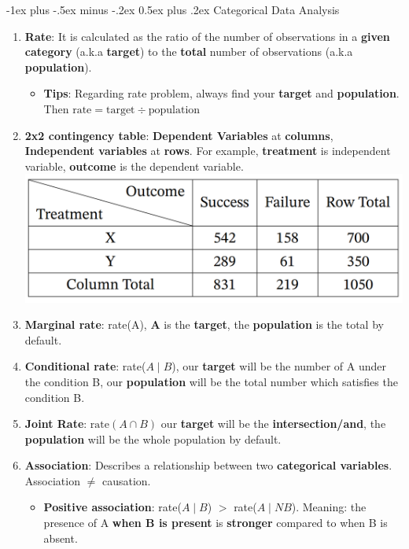 \documentclass[10pt, landscape]{article}
\makeatletter
\renewcommand{\section}{\@startsection{section}{1}{0mm}%
                                {-1ex plus -.5ex minus -.2ex}%
                                {0.5ex plus .2ex}%
                                {\normalfont\large\bfseries}}
\makeatother
\begin{document}
\begin{multicols}{4}
\section{Categorical Data Analysis}
\begin{enumerate}
    \item \textbf{Rate}: It is calculated as the ratio of the number of observations in a \textbf{given category} (a.k.a \textbf{target}) to the \textbf{total} number of observations (a.k.a \textbf{population}).
    \begin{itemize}
        \item \textbf{Tips}: Regarding rate problem, always find your \textbf{target} and \textbf{population}. Then $\text{rate}=\text{target}\div \text{population}$
    \end{itemize}
    \item \textbf{2x2 contingency table}: \textbf{Dependent Variables} at \textbf{columns}, \textbf{Independent variables} at \textbf{rows}. For example, \textbf{treatment} is independent variable, \textbf{outcome} is the dependent variable.
    \includegraphics[width=1\linewidth]{images/1.png}
    \item \textbf{Marginal rate}: rate(A), \textbf{A} is the \textbf{target}, the \textbf{population} is the total by default.
    \item \textbf{Conditional rate}: rate($A\mid B$), our \textbf{target} will be the number of A under the condition B, our \textbf{population} will be the total number which satisfies the condition B.
    \item \textbf{Joint Rate}: $\text{rate}(A\cap B)$ our \textbf{target} will be the \textbf{intersection/and}, the \textbf{population} will be the whole population by default.
    \item \textbf{Association}: Describes a relationship between two \textbf{categorical variables}. Association $\neq$ causation.
    \begin{itemize}
        \item \textbf{Positive association}: rate($A \mid B$) $>$ rate($A \mid NB$). Meaning: the presence of A \textbf{when B is present} is \textbf{stronger} compared to when B is absent.

\end{itemize}
\end{enumerate}
\end{multicols}
\end{document}
